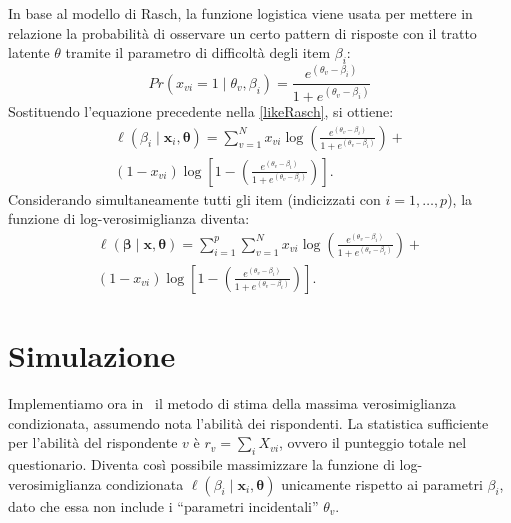 In base al modello di Rasch, la funzione logistica viene usata per mettere in relazione la probabilità di osservare un certo pattern di risposte con il tratto latente $\theta$ tramite il parametro di difficoltà degli item $\beta_i$:
\begin{equation*} 
  Pr(x_{vi} = 1\mid  \theta_v, \beta_i) = \frac{e^{(\theta_v-\beta_i)}}{1+e^{(\theta_v-\beta_i)}}
\label{rasch}
\end{equation*}
\noindent
Sostituendo l'equazione precedente nella \ref{likeRasch}, si ottiene:
\begin{multline}
\ell (\beta_i \mid  \boldsymbol{x}_i, \boldsymbol{\theta}) = \sum_{v=1}^N x_{vi}\log \left( \frac{e^{(\theta_v-\beta_i)}}{1+e^{(\theta_v-\beta_i)}}\right)+\\ (1-x_{vi})\log\left[1-\left(\frac{e^{(\theta_v-\beta_i)}}{1+e^{(\theta_v-\beta_i)}}\right)\right]. 
\label{eq:eq5.8}
\end{multline}
Considerando simultaneamente tutti gli item (indicizzati con $i=1, \dots, p$), la funzione di log-verosimiglianza diventa:
\begin{multline} 
\ell (\boldsymbol{\beta} \mid  \boldsymbol{x}, \boldsymbol{\theta}) = \sum_{i=1}^p \sum_{v=1}^N x_{vi}\log \left( \frac{e^{(\theta_v-\beta_i)}}{1+e^{(\theta_v-\beta_i)}}\right)+\\ (1-x_{vi})\log\left[1-\left(\frac{e^{(\theta_v-\beta_i)}}{1+e^{(\theta_v-\beta_i)}}\right)\right].   
\end{multline} 


\section{Simulazione}

Implementiamo ora in \R\, il metodo di stima della massima verosimiglianza condizionata, assumendo nota l'abilità dei rispondenti.  La statistica sufficiente per l'abilità del rispondente $v$ è $r_{v}=\sum_iX_{vi}$,  ovvero il punteggio totale nel questionario.
Diventa così possibile massimizzare la funzione di log-verosimiglianza condizionata $\ell(\beta_i \mid \boldsymbol{x}_i, \boldsymbol{\theta})$ unicamente rispetto ai parametri $\beta_i$, dato che essa non include i ``parametri incidentali'' $\theta_v$.


